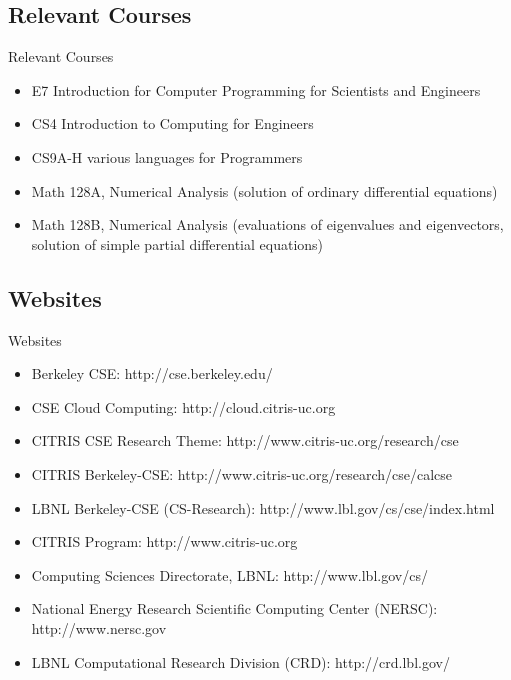 \documentclass[xcolor=x11names,compress]{beamer}
\renewcommand{\(}{\begin{columns}}
\renewcommand{\)}{\end{columns}}
\newcommand{\<}[1]{\begin{column}{#1}}
\renewcommand{\>}{\end{column}}
\begin{document}
\subsection{Relevant Courses}
\begin{frame}{Relevant Courses}
\begin{itemize}
\item E7 Introduction for Computer Programming for Scientists and Engineers
\item CS4 Introduction to Computing for Engineers
\item CS9A-H various languages for Programmers
\item Math 128A, Numerical Analysis (solution of ordinary differential equations)
\item Math 128B, Numerical Analysis (evaluations of eigenvalues and eigenvectors, solution of simple partial differential equations)
\end{itemize}
\end{frame}

\subsection{Websites}
\begin{frame}{Websites}
\begin{itemize}
\item Berkeley CSE: http://cse.berkeley.edu/
\item CSE Cloud Computing: http://cloud.citris-uc.org
\item CITRIS CSE Research Theme: http://www.citris-uc.org/research/cse
\item CITRIS Berkeley-CSE: http://www.citris-uc.org/research/cse/calcse	
\item LBNL Berkeley-CSE (CS-Research):  http://www.lbl.gov/cs/cse/index.html
\item CITRIS Program: http://www.citris-uc.org
\item Computing Sciences Directorate, LBNL: http://www.lbl.gov/cs/
\item National Energy Research Scientific Computing Center (NERSC): http://www.nersc.gov	
\item LBNL Computational Research Division (CRD): http://crd.lbl.gov/
\end{itemize}
\end{frame}

\end{document}
